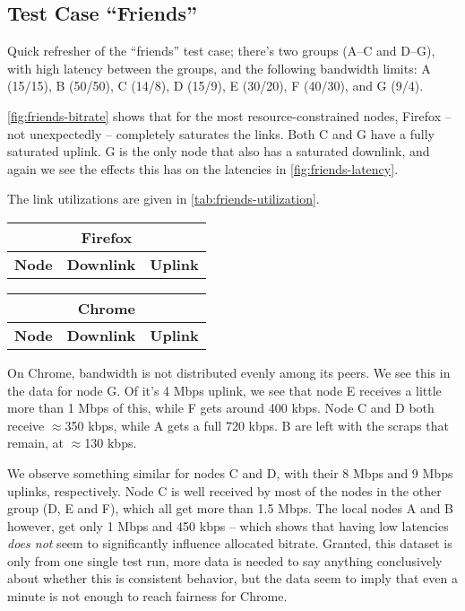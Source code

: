 \subsection{Test Case ``Friends''}

Quick refresher of the ``friends'' test case; there's two groups (A--C and D--G), with high latency between the groups, and the following bandwidth limits: A (15/15), B (50/50), C (14/8), D (15/9), E (30/20), F (40/30), and G (9/4).

\autoref{fig:friends-bitrate} shows that for the most resource-constrained nodes, Firefox -- not unexpectedly -- completely saturates the links. Both C and G have a fully saturated uplink. G is the only node that also has a saturated downlink, and again we see the effects this has on the latencies in \autoref{fig:friends-latency}.

The link utilizations are given in \autoref{tab:friends-utilization}.

\begin{center}
    \label{tab:friends-utilization}
    \begin{tabular}{| l | l | l |}
    \multicolumn{3}{c}{\textbf{Firefox}} \\ \hline
    \textbf{Node} & \textbf{Downlink} & \textbf{Uplink} \\ \hline
    
    \hline
    \end{tabular}
    \begin{tabular}{| l | l | l |}
    \multicolumn{3}{c}{\textbf{Chrome}} \\ \hline
    \textbf{Node} & \textbf{Downlink} & \textbf{Uplink} \\ \hline
    
    \hline
    \end{tabular}
\end{center}

On Chrome, bandwidth is not distributed evenly among its peers. We see this in the data for node G. Of it's 4 Mbps uplink, we see that node E receives a little more than 1 Mbps of this, while F gets around 400 kbps. Node C and D both receive $\approx$350 kbps, while A gets a full 720 kbps. B are left with the scraps that remain, at $\approx$130 kbps.

We observe something similar for nodes C and D, with their 8 Mbps and 9 Mbps uplinks, respectively. Node C is well received by most of the nodes in the other group (D, E and F), which all get more than 1.5 Mbps. The local nodes A and B however, get only 1 Mbps and 450 kbps -- which shows that having low latencies \emph{does not} seem to significantly influence allocated bitrate. Granted, this dataset is only from one single test run, more data is needed to say anything conclusively about whether this is consistent behavior, but the data seem to imply that even a minute is not enough to reach fairness for Chrome.

